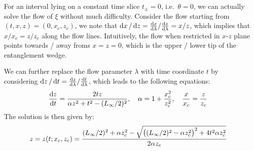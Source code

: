 \documentclass[11pt,a4paper]{article}
\begin{document}
\pagebreak
	
	For an interval lying on a constant time slice $t_\pm = 0$, i.e.~$\theta = 0$, we can actually solve the flow of $\xi$ without much difficulty.
	Consider the flow starting from $(t,x,z) = (0,x_c,z_c)$, we note that $
		\dd{x}/\dd{z}
		= {\dv{x}{\lambda}}/{\dv{z}{\lambda}}
		= {x}/{z}
	$, which implies that ${x}/{x_c} = {z}/{z_c}$ along the flow lines. Intuitively, the flow when restricted in $x$-$z$ plane points towards / away froms $x = z = 0$, which is the upper / lower tip of the entanglement wedge. 
	
	We can further replace the flow parameter $\lambda$ with time coordinate $t$ by considering $
		\dd{z}/\dd{t}
		= {\dv{z}{\lambda}}/{\dv{t}{\lambda}}
	$, which leads to the following equations:
	\begin{equation}
		\dv{z}{t}
		= \frac{2tz}{\alpha z^2 + t^2 - (L_\infty/2)^2},
	\quad
		\alpha = 1 + \frac{x_c^2}{z_c^2},
	\quad
		\frac{x}{x_c} = \frac{z}{z_c}
	\end{equation}
	The solution is then given by:
	\begin{equation}
		z = z(t;x_c,z_c)
		= \frac{
				(L_\infty/2)^2 + \alpha z_c^2
				- \sqrt{
					\pqty\big{(L_\infty/2)^2 - \alpha z_c^2}^2
					+ 4t^2 \alpha z_c^2
				}
			}{2\alpha z_c}
	\end{equation}
	
%	
	
\end{document}
